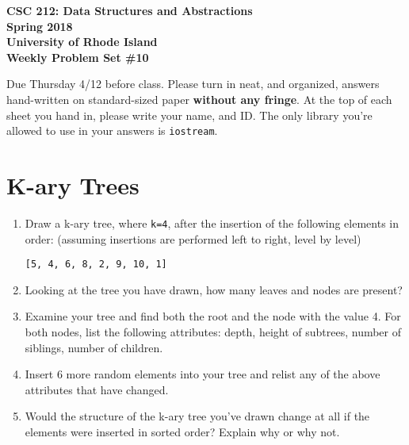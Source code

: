 \documentclass[11pt]{article}
\begin{document}
\thispagestyle{empty}

\begin{center}
    {\Large\bf CSC 212: Data Structures and Abstractions}\\
    \medskip
    {\Large\bf Spring 2018}\\
    \medskip
    {\Large\bf University of Rhode Island}\\
    \bigskip
    {\Large\bf Weekly Problem Set \#10}
\end{center}

Due Thursday 4/12 before class. Please turn in neat, and organized, answers hand-written on standard-sized paper \textbf{without any fringe}. At the top of each sheet you hand in, please write your name, and ID.
The only library you're allowed to use in your answers is \verb|iostream|.

\section{K-ary Trees}
\begin{enumerate}
    \item Draw a k-ary tree, where \verb|k=4|, after the insertion of the following elements in order: (assuming insertions are performed left to right, level by level)
    
    \verb|[5, 4, 6, 8, 2, 9, 10, 1]|
    
    \item Looking at the tree you have drawn, how many leaves and nodes are present? 
    
    \item Examine your tree and find both the root and the node with the value 4. For both nodes, list the following attributes: depth, height of subtrees, number of siblings, number of children. 
    
    \item Insert 6 more random elements into your tree and relist any of the above attributes that have changed.
    
    \item Would the structure of the k-ary tree you've drawn change at all if the elements were inserted in sorted order? Explain why or why not.
\end{enumerate}
\end{document}
